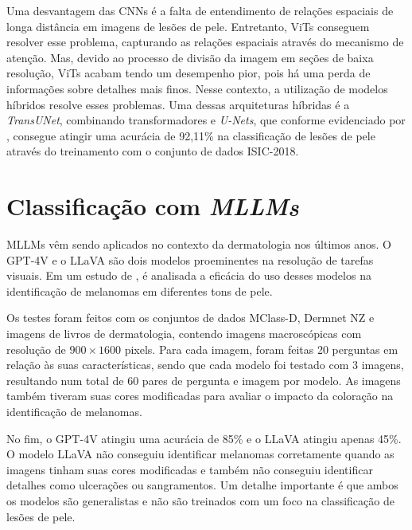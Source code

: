 Uma desvantagem das \acp{CNN} é a falta de entendimento de relações espaciais de longa distância em imagens de lesões de pele. Entretanto, \acp{ViT} conseguem resolver
esse problema, capturando as relações espaciais através do mecanismo de atenção. Mas, devido ao processo de divisão da imagem em seções de baixa resolução, \acp{ViT}
acabam tendo um desempenho pior, pois há uma perda de informações sobre detalhes mais finos. Nesse contexto, a utilização de modelos híbridos resolve esses problemas.
Uma dessas arquiteturas híbridas é a \textit{TransUNet}, combinando transformadores e \textit{U-Nets}, que conforme evidenciado por \textcite{gulzar2022skin}, consegue
atingir uma acurácia de 92,11\% na classificação de lesões de pele através do treinamento com o conjunto de dados \ac{ISIC}-2018.

\section{Classificação com \textit{MLLMs}}

\acp{MLLM} vêm sendo aplicados no contexto da dermatologia nos últimos anos. O \ac{GPT}-4V e o \ac{LLaVA} são dois modelos proeminentes na resolução de tarefas
visuais. Em um estudo de \textcite{cirone2024assessing}, é analisada a eficácia do uso desses modelos na identificação de melanomas em diferentes tons de pele.

Os testes foram feitos com os conjuntos de dados MClass-D, Dermnet NZ e imagens de livros de dermatologia, contendo imagens macroscópicas com resolução de
\begin{math}900 \times 1600\end{math} pixels. Para cada imagem, foram feitas 20 perguntas em relação às suas características, sendo que cada modelo foi testado com 3
imagens, resultando num total de 60 pares de pergunta e imagem por modelo. As imagens também tiveram suas cores modificadas para avaliar o impacto da coloração na
identificação de melanomas.


No fim, o \ac{GPT}-4V atingiu uma acurácia de 85\% e o \ac{LLaVA} atingiu apenas 45\%. O modelo \ac{LLaVA} não conseguiu identificar melanomas corretamente quando as
imagens tinham suas cores modificadas e também não conseguiu identificar detalhes como ulcerações ou sangramentos. Um detalhe importante é que ambos os modelos são
generalistas e não são treinados com um foco na classificação de lesões de pele.

